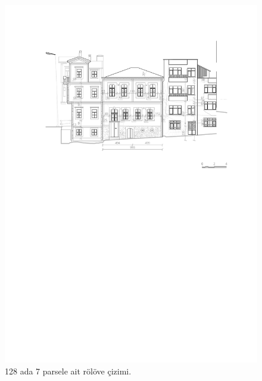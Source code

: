 \begin{figure}
\centering
\includegraphics[width=1\textwidth,height=\textheight]{source/figures/Roloveler/R128-7.pdf}
\caption{128 ada 7 parsele ait rölöve çizimi.}
\end{figure}

